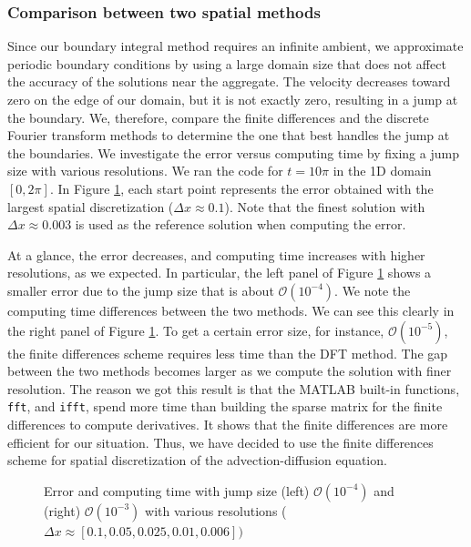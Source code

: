 \subsubsection{Comparison between two spatial methods}
Since our boundary integral method requires an infinite ambient, we approximate periodic boundary conditions by using a large domain size that does not affect the accuracy of the solutions near the aggregate. The velocity decreases toward zero on the edge of our domain,
but it is not exactly zero, resulting in a jump at the boundary.
We, therefore, compare the finite differences and the discrete Fourier transform methods to determine the one that best handles the jump at the boundaries. We investigate the error versus computing time by fixing a jump size with various resolutions. We ran the code for $t = 10 \pi$ in the 1D domain $[0, 2\pi].$ In Figure \ref{fig_precision}, each start point represents the error obtained with the largest spatial discretization ($\Delta x \approx 0.1$). Note that the finest solution with $\Delta x \approx 0.003$ is used as the reference solution when computing the error. 
\par
At a glance, the error decreases, and computing time increases with higher resolutions, as we expected. In particular, the left panel of Figure \ref{fig_precision} shows a smaller error due to the jump size that is about $\mathcal{O}(10^{-4})$.
We note the computing time differences between the two methods. We can see this clearly in the right panel of Figure \ref{fig_precision}. To get a certain error size, for instance, $\mathcal{O}(10^{-5})$, the finite differences scheme requires less time than the DFT method. The gap between the two methods becomes larger as we compute the solution with finer resolution.  
The reason we got this result is that the MATLAB built-in functions, \verb+fft+, and \verb+ifft+, spend more time than building the sparse matrix for the finite differences to compute derivatives. It shows that the finite differences are more efficient for our situation. 
Thus, we have decided to use the finite differences scheme for spatial discretization of the advection-diffusion equation.
\begin{figure}[ht]
	\begin{center}
	\end{center}
	\caption{Error and computing time with jump size (left) $\mathcal{O}(10^{-4})$ and (right) $\mathcal{O}(10^{-3})$ with various resolutions ($\Delta x \approx [0.1, 0.05, 0.025, 0.01, 0.006])$}
	\label{fig_precision}
\end{figure}

